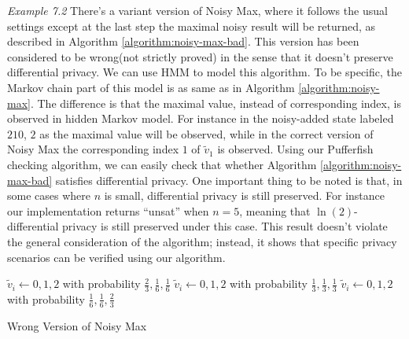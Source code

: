 \noindent
\textit{Example 7.2} There's a variant version of Noisy Max, where it follows the usual settings
except at the last step the maximal
noisy result will be returned, as described in Algorithm \ref{algorithm:noisy-max-bad}.
This version has been considered to be wrong(not strictly proved) in the sense that it doesn't preserve differential privacy.
We can use HMM to model this algorithm.
To be specific, the Markov chain part of this model is as same as in Algorithm \ref{algorithm:noisy-max}.
The difference is that the maximal value, instead of corresponding index, is observed in hidden Markov
model. For instance in the noisy-added state labeled $210$,
$2$ as the maximal value will be observed, while in the correct version of Noisy Max the corresponding index $1$ of $\tilde{v}_1$ is observed.
Using our Pufferfish checking algorithm, we can easily check that whether
Algorithm \ref{algorithm:noisy-max-bad} satisfies differential privacy.
One important thing to be noted is that, in some cases where $n$ is small,
differential privacy is still preserved.
For instance our implementation returns ``unsat'' when $n=5$, meaning that
$\ln(2)$-differential privacy is still preserved under this case.
This result doesn't violate the general consideration of the algorithm;
instead, it shows that specific privacy scenarios can be verified using our algorithm.

\begin{algorithm}
  \begin{algorithmic}[1]
                {$\tilde{v}_i \leftarrow 0, 1, 2$ with probability
                 $\frac{2}{3}, \frac{1}{6}, \frac{1}{6}$}
                {$\tilde{v}_i \leftarrow 0, 1, 2$ with probability
                 $\frac{1}{3}, \frac{1}{3}, \frac{1}{3}$}
                {$\tilde{v}_i \leftarrow 0, 1, 2$ with probability
                 $\frac{1}{6}, \frac{1}{6}, \frac{2}{3}$}
        \EndMatch
      \EndFor
    \EndFunction
  \end{algorithmic}
  \caption{Wrong Version of Noisy Max}
  \label{algorithm:noisy-max-bad}
\end{algorithm}
